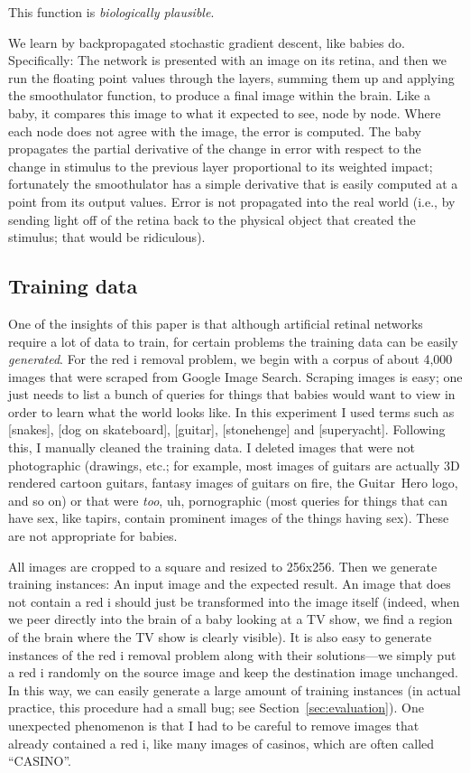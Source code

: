\documentclass[twocolumn]{article}
\begin{document}
This function is {\em biologically plausible}.

We learn by backpropagated stochastic gradient descent, like babies
do. Specifically: The network is presented with an image on its
retina, and then we run the floating point values through the layers,
summing them up and applying the smoothulator function, to produce a
final image within the brain. Like a baby, it compares this image to
what it expected to see, node by node. Where each node does not agree
with the image, the error is computed. The baby propagates the partial
derivative of the change in error with respect to the change in
stimulus to the previous layer proportional to its weighted impact;
fortunately the smoothulator has a simple derivative that is easily
computed at a point from its output values. Error is not propagated
into the real world (i.e., by sending light off of the retina back to
the physical object that created the stimulus; that would be
ridiculous).

\subsection{Training data}

One of the insights of this paper is that although artificial retinal
networks require a lot of data to train, for certain problems the
training data can be easily {\em generated}. For the red i removal
problem, we begin with a corpus of about 4,000 images that were
scraped from Google Image Search. Scraping images is easy; one just
needs to list a bunch of queries for things that babies would want to
view in order to learn what the world looks like. In this experiment I
used terms such as [snakes], [dog on skateboard], [guitar],
[stonehenge] and [superyacht]. Following this, I manually cleaned the
training data. I deleted images that were not photographic (drawings,
etc.; for example, most images of guitars are actually 3D rendered
cartoon guitars, fantasy images of guitars on fire, the Guitar~Hero logo,
and so on) or that were {\em too}, uh, pornographic (most queries for
things that can have sex, like tapirs, contain prominent images of the
things having sex). These are not appropriate for babies.

All images are cropped to a square and resized to 256x256. Then we
generate training instances: An input image and the expected result.
An image that does not contain a red i should just be transformed into
the image itself (indeed, when we peer directly into the brain of a
baby looking at a TV show, we find a region of the brain where the TV
show is clearly visible). It is also easy to generate instances of the
red i removal problem along with their solutions---we simply put a red
i randomly on the source image and keep the destination image
unchanged. In this way, we can easily generate a large amount of
training instances (in actual practice, this procedure had a small bug;
see Section~\ref{sec:evaluation}). One unexpected phenomenon is that
I had to be careful to remove images that already contained a red i,
like many images of casinos, which are often called ``CASINO''.
\end{document}

